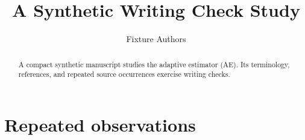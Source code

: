 \documentclass{article}
\title{A Synthetic Writing Check Study}
\author{Fixture Authors}
\begin{document}
\maketitle
\begin{abstract}
A compact synthetic manuscript studies the adaptive estimator (AE).
Its terminology, references, and repeated source occurrences exercise writing checks.
\end{abstract}


\section{Repeated observations}



\appendix



\end{document}
